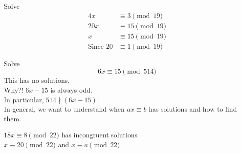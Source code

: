     \begin{example}
        Solve
        \begin{align*}
            4x &\equiv 3 \pmod{19} \\
            20x &\equiv 15 \pmod{19} \\
            x &\equiv 15 \pmod{19} \\
            \text{Since } 20 &\equiv 1 \pmod{19}
        \end{align*}
    \end{example}

    \begin{example}
        Solve
        \[
            6x\equiv 15 \pmod{514}
        \]
        This has no solutions. \\
        Why?! $6x-15$ is always odd. \\
        In particular, $514\nmid (6x-15)$. \\
        In general, we want to understand when $ax\equiv b$ has solutions 
        and how to find them.
    \end{example}

    \begin{example}
        $18x\equiv 8 \pmod{22}$ has incongruent solutions \\
        $x\equiv 20 \pmod{22}$ and $x\equiv a\pmod{22}$
    \end{example}

